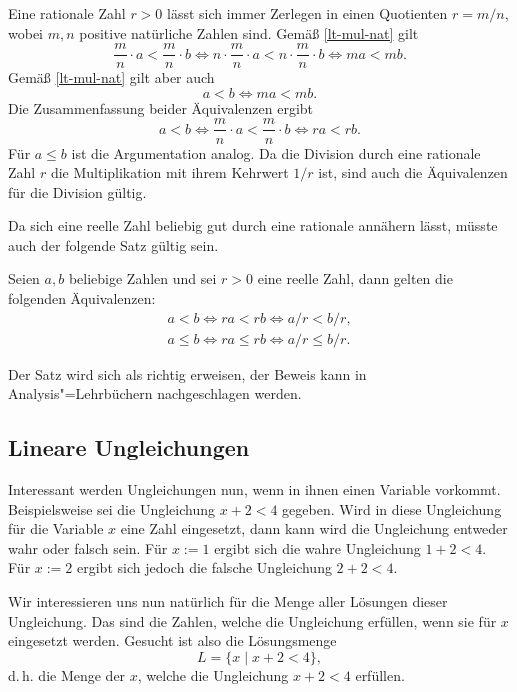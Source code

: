 \noindent{}
Eine rationale Zahl $r>0$ lässt sich immer Zerlegen in einen Quotienten
$r=m/n$, wobei $m,n$ positive natürliche Zahlen sind. Gemäß
\eqref{lt-mul-nat} gilt
\begin{equation}
\frac{m}{n}\cdot a<\frac{m}{n}\cdot b
\iff n\cdot\frac{m}{n}\cdot a<n\cdot\frac{m}{n}\cdot b
\iff ma<mb.
\end{equation}
Gemäß \eqref{lt-mul-nat} gilt aber auch
\begin{equation}
a<b\iff ma<mb.
\end{equation}
Die Zusammenfassung beider Äquivalenzen ergibt
\begin{equation}
a<b\iff \frac{m}{n}\cdot a<\frac{m}{n}\cdot b\iff ra<rb.
\end{equation}
Für $a\le b$ ist die Argumentation analog. Da die Division durch
eine rationale Zahl $r$ die Multiplikation mit ihrem Kehrwert $1/r$ ist,
sind auch die Äquivalenzen für die Division gültig.\;\qedsymbol

Da sich eine reelle Zahl beliebig gut durch eine rationale annähern
lässt, müsste auch der folgende Satz gültig sein.

\begin{Satz}
Seien $a,b$ beliebige Zahlen und sei $r>0$ eine reelle Zahl,
dann gelten die folgenden Äquivalenzen:
\begin{gather}
\label{lt-mul-real} a<b\iff ra<rb\iff a/r<b/r,\\
\label{lt-mul-real} a\le b\iff ra\le rb\iff a/r\le b/r.
\end{gather}
\end{Satz}

\noindent
Der Satz wird sich als richtig erweisen, der Beweis kann in
Analysis"=Lehrbüchern nachgeschlagen werden.

\subsection{Lineare Ungleichungen}

Interessant werden Ungleichungen nun, wenn in ihnen einen Variable
vorkommt. Beispielsweise sei die Ungleichung $x+2<4$ gegeben.
Wird in diese Ungleichung für die Variable $x$ eine Zahl eingesetzt,
dann kann wird die Ungleichung entweder wahr oder falsch sein.
Für $x:=1$ ergibt sich die wahre Ungleichung $1+2<4$. Für $x:=2$
ergibt sich jedoch die falsche Ungleichung $2+2<4$.

Wir interessieren uns nun natürlich für die Menge aller Lösungen
dieser Ungleichung. Das sind die Zahlen, welche die Ungleichung
erfüllen, wenn sie für $x$ eingesetzt werden. Gesucht ist also
die Lösungsmenge
\[L = \{x\mid x+2<4\},\]
d.\,h. die Menge der $x$, welche die Ungleichung $x+2<4$ erfüllen.

